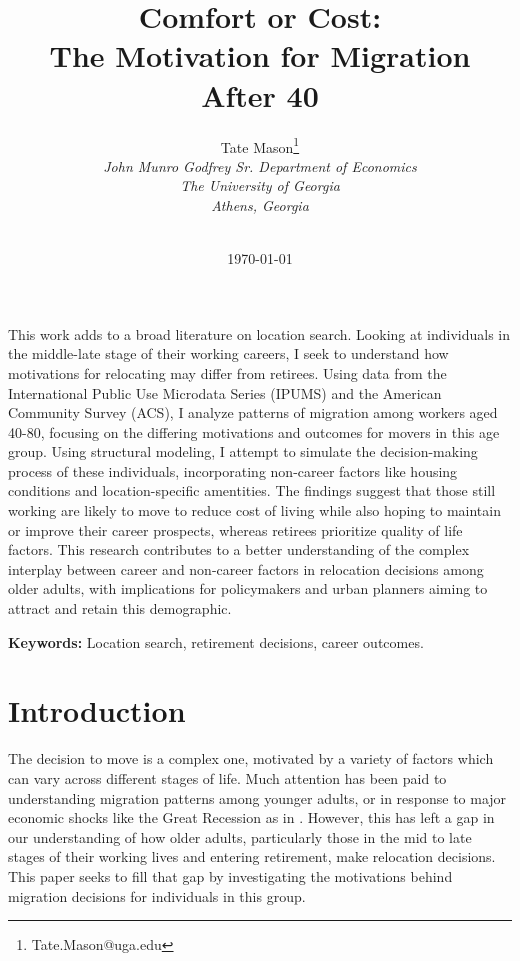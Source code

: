 \documentclass[11pt,a4paper]{article}
\title{Comfort or Cost: \\
The Motivation for Migration After 40}
\author{
    Tate Mason\thanks{Tate.Mason@uga.edu} \\
    \textit{John Munro Godfrey Sr. Department of Economics} \\
    \textit{The University of Georgia} \\
    \textit{Athens, Georgia} \\
    \\
}
\date{\today}
\newenvironment{abstract}%
{\cleardoublepage\null \vfill\begin{center}%
\bfseries \abstractname \end{center}}%
{\vfill\null}
\begin{document}
\maketitle
\thispagestyle{empty}

\begin{abstract}
\noindent %

This work adds to a broad literature on location search. Looking at individuals in the middle-late stage of their working careers, I seek to understand how motivations for relocating may differ from retirees. Using data from the International Public Use Microdata Series (IPUMS) and the American Community Survey (ACS), I analyze patterns of migration among workers aged 40-80, focusing on the differing motivations and outcomes for movers in this age group. Using structural modeling, I attempt to simulate the decision-making process of these individuals, incorporating non-career factors like housing conditions and location-specific amentities. The findings suggest that those still working are likely to move to reduce cost of living while also hoping to maintain or improve their career prospects, whereas retirees prioritize quality of life factors. This research contributes to a better understanding of the complex interplay between career and non-career factors in relocation decisions among older adults, with implications for policymakers and urban planners aiming to attract and retain this demographic.

\vspace{0.3cm}
\noindent \textbf{Keywords:} %
Location search, retirement decisions, career outcomes.
\end{abstract}

\newpage
\setcounter{page}{1}

\section{Introduction}
\label{sec:introduction}

The decision to move is a complex one, motivated by a variety of factors which can vary across different stages of life. Much attention has been paid to understanding migration patterns among younger adults, or in response to major economic shocks like the Great Recession as in \cite{molloy_internal_2011}. However, this has left a gap in our understanding of how older adults, particularly those in the mid to late stages of their working lives and entering retirement, make relocation decisions. This paper seeks to fill that gap by investigating the motivations behind migration decisions for individuals in this group. 
\end{document}
